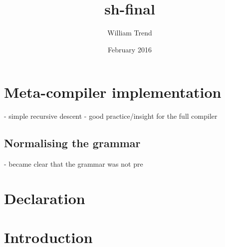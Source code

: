 \documentclass{article}
\title{sh-final}
\author{William Trend}
\date{February 2016}
\begin{document}
\maketitle

\section{Meta-compiler implementation}
- simple recursive descent
- good practice/insight for the full compiler

\subsection{Normalising the grammar}
- became clear that the grammar was not pre

\begin{abstract}

\end{abstract}

\section{Declaration}

\section{Introduction}
\end{document}
